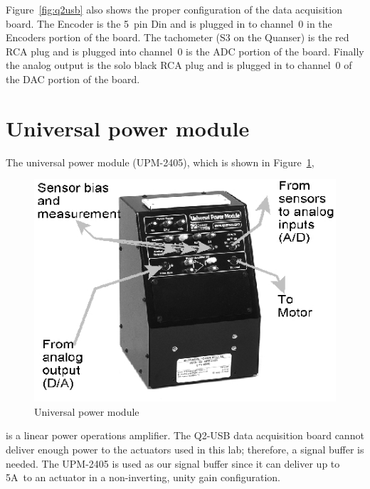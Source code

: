 Figure~\ref{fig:q2usb} also shows the proper configuration of the data
acquisition board.  The Encoder is the 5~pin Din and is plugged in to
channel~0 in the Encoders portion of the board. The tachometer (S3 on the
Quanser) is the red RCA plug and is plugged into channel~0 is the ADC
portion of the board.  Finally the analog output is the solo black RCA plug
and is plugged in to channel~0 of the DAC portion of the board.

\section{Universal power module}

The universal power module (UPM-2405), which is shown in
Figure~\ref{fig:power}\@,
\begin{figure}[htbp]
    \centering
    \includegraphics[width=0.6\hsize]{pix/power.jpg}
    \caption{Universal power module}\label{fig:power}
\end{figure}%
is a linear power operations amplifier. The Q2-USB data acquisition board
cannot deliver enough power to the actuators used in this lab; therefore, a
signal buffer is needed.  The UPM-2405 is used as our signal buffer since it
can deliver up to 5A~to an actuator in a non-inverting, unity gain
configuration.

